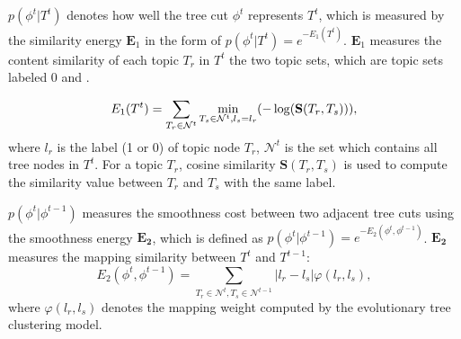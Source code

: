$p({\phi}^t|T^t)$ denotes how well the tree cut ${\phi}^t$ represents $T^t$, which is measured by the similarity energy $\mathbf{E}_1$ in the form of $p({\phi}^t|T^t) = e^{-E_1(T^t)}$.
$\mathbf{E}_1$ measures the content similarity of each topic $T_r$ in $T^t$  the two topic sets, which are topic  sets labeled 0 and .

\vspace{-3mm}
\begin{equation}
\small
E_1(T^t) = \sum_{T_r\in{\mathcal{N}^t}}\min_{T_s\in{\mathcal{N}^t},l_s=l_r}(-\log(\mathbf{S}(T_r,T_s))),
\end{equation}
where $l_r$ is the label (1 or 0) of topic node $T_r$, $\mathcal{N}^t$ is the set which contains all tree nodes in $T^t$.
For a topic $T_r$,  cosine similarity $\mathbf{S}(T_r,T_s)$ is used to compute the similarity value between $T_r$ and $T_s$ with the same label.

$p({\phi}^t|{\phi}^{t-1})$ measures the smoothness cost between two adjacent tree cuts using the smoothness energy $\mathbf{E_2}$, which is defined as $p({\phi}^t|{\phi}^{t-1})= e^{-E_2(\phi^t,\phi^{t-1})}$. $\mathbf{E_2}$ measures the mapping similarity between $T^t$ and $T^{t-1}$:
\vspace{-3mm}
\begin{equation}
E_2(\phi^t,\phi^{t-1}) = \sum\limits_{T_r\in{\mathcal{N}^t},T_s\in{\mathcal{N}^{t-1}}}|l_r-l_s|\varphi(l_r,l_s),
\label{eq:hmm5}
\end{equation}
where $\varphi(l_r,l_s)$ denotes the mapping weight computed by the evolutionary tree clustering model.


%

